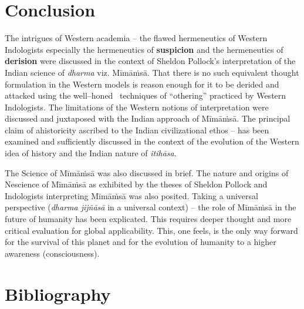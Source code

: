 \section*{Conclusion}

The intrigues of Western academia – the flawed hermeneutics of Western Indologists especially the hermeneutics of \textbf{suspicion} and the hermeneutics of \textbf{derision} were discussed in the context of Sheldon Pollock’s interpretation of the Indian science of \textit{dharma} viz. Mīmāṁsā. That there is no such equivalent thought formulation in the Western models is reason enough for it to be derided and attacked using the well–honed  techniques of “othering” practiced by Western Indologists. The limitations of the Western notions of interpretation were discussed and juxtaposed with the Indian approach of Mīmāṁsā. The principal claim of ahistoricity ascribed to the Indian civilizational ethos – has been examined and sufficiently discussed in the context of the evolution of the Western idea of history and the Indian nature of \textit{itihāsa}.

The Science of Mīmāṁsā was also discussed in brief. The nature and origins of Nescience of Mīmāṁsā as exhibited by the theses of Sheldon Pollock and Indologists interpreting Mīmāṁsā was also posited. Taking a universal perspective (\textit{dharma jijñāsā} in a universal context) – the role of Mīmāṁsā in the future of humanity has been explicated. This requires deeper thought and more critical evaluation for global applicability. This, one feels, is the only way forward for the survival of this planet and for the evolution of humanity to a higher awareness (consciousness).


\section*{Bibliography}

